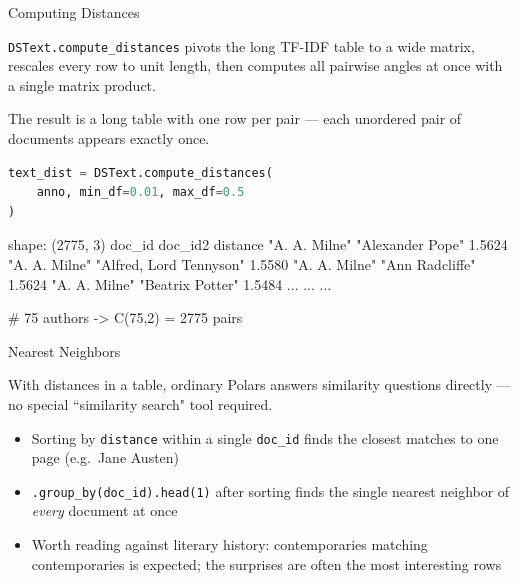 \documentclass[8pt,aspectratio=169]{beamer}
\begin{document}
\begin{frame}[fragile]{Computing Distances}
\begin{splitcode}{%

\texttt{DSText.compute\_distances} pivots the long TF-IDF table to a wide matrix, rescales every row to unit length, then computes all pairwise angles at once with a single matrix product.

The result is a long table with one row per pair --- each unordered pair of documents appears exactly once.

}
\begin{lstlisting}[language=Python]
text_dist = DSText.compute_distances(
    anno, min_df=0.01, max_df=0.5
)
\end{lstlisting}
\begin{codeoutput}
shape: (2775, 3)
doc_id         doc_id2                  distance
"A. A. Milne"  "Alexander Pope"         1.5624
"A. A. Milne"  "Alfred, Lord Tennyson"  1.5580
"A. A. Milne"  "Ann Radcliffe"          1.5624
"A. A. Milne"  "Beatrix Potter"         1.5484
...            ...                      ...

# 75 authors -> C(75,2) = 2775 pairs
\end{codeoutput}
\end{splitcode}
\end{frame}

\begin{textframe}{Nearest Neighbors}

With distances in a table, ordinary Polars answers similarity questions directly --- no special ``similarity search" tool required.

\begin{itemize}
\item Sorting by \texttt{distance} within a single \texttt{doc\_id} finds the closest matches to one page (e.g.\ Jane Austen)
\item \texttt{.group\_by(doc\_id).head(1)} after sorting finds the single nearest neighbor of \textit{every} document at once
\item Worth reading against literary history: contemporaries matching contemporaries is expected; the surprises are often the most interesting rows
\end{itemize}

\end{textframe}
\end{document}
